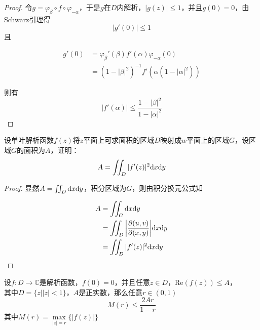 \begin{proof}
    
    令$g = \varphi_{\beta}\circ f \circ \varphi_{-\alpha}$，于是$g$在$D$内解析，$|g(z)| \leq 1$，并且$g(0) = 0$，由\textup{Schwarz}引理得
    $$|g'(0)| \leq 1$$
    且
    
    \begin{align*}
        g'(0) & = \varphi_{\beta}'(\beta) f'(\alpha) \varphi_{-\alpha}(0)\\
        & =  (1 -|\beta|^2)^{-1}f'(\alpha (1 - |\alpha|^2))
    \end{align*}

    则有
    $$|f'(\alpha)| \leq \dfrac{1-|\beta|^2}{1 - |\alpha|^2}$$

\end{proof}

\begin{proposition}
    
    设单叶解析函数$f(z)$将$z$平面上可求面积的区域$D$映射成$w$平面上的区域$G$，设区域$G$的面积为$A$，证明：
    $$ A = \iint_{D}{|f'(z)|^2}\mathrm{d} x\mathrm{d} y$$

\end{proposition}

\begin{proof}
    
    显然$A = \iint_{D}\mathrm{d} x\mathrm{d} y$，积分区域为$G$，则由积分换元公式知

    \begin{align*}
        A & = \iint_{G}\mathrm{d} x\mathrm{d} y \\
          & = \iint_{D}{\left|\dfrac{\partial(u,v)}{\partial(x,y)}\right|}\mathrm{d} x\mathrm{d} y \\
          & = \iint_{D}{|f'(z)|^2}\mathrm{d} x\mathrm{d} y
    \end{align*}

\end{proof}

\begin{proposition}
    
    设$f:D\to\mathbb{C}$是解析函数，$f(0) = 0$，并且任意$z \in D$，$\mathrm{Re}(f(z)) \leq A$，\\
    其中$D = \{z \big| |z| < 1\}$，$A$是正实数，那么任意$r \in (0,1)$
    $$M(r) \leq \dfrac{2Ar}{1-r}$$
    其中$M(r) = \max\limits_{|z|=r}\{|f(z)|\}$

\end{proposition}

